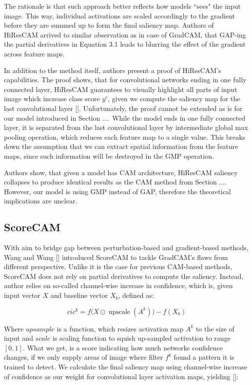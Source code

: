 The rationale is that such approach better reflects how models ``sees" the input image. This way, individual activations are scaled accordingly to the gradient before they are summed up to form the final saliency map. Authors of HiResCAM arrived to similar observation as in case of GradCAM, that GAP-ing the partial derivatives in Equation 3.1 leads to blurring the effect of the gradient across feature maps. 

In addition to the method itself, authors present a proof of HiResCAM's capabilities. The proof shows, that for convolutional networks ending in one fully connected layer, HiResCAM guarantees to visually highlight all parts of input image which increase class score $y^c$, given we compute the saliency map for the last convolutional layer []. Unfortunately, the proof cannot be extended as is for our model introduced in Section .... While the model ends in one fully connected layer, it is separated from the last convolutional layer by intermediate global max pooling operation, which reduces each feature map to a single value. This breaks down the assumption that we can extract spatial information from the feature maps, since such information will be destroyed in the GMP operation. 

Authors show, that given a model has CAM architecture, HiResCAM saliency collapses to produce identical results as the CAM method from Section .... However, our model is using GMP instead of GAP, therefore the theoretical implications are unclear.


\subsection{ScoreCAM}

With aim to bridge gap between perturbation-based and gradient-based methods, Wang and Wang [] introduced ScoreCAM to tackle GradCAM's flaws from different perspective. Unlike it is the case for previous CAM-based methods, ScoreCAM does not rely on partial derivatives to compute the saliency. Instead, author relies on so-called channel-wise increase in confidence, which is, given input vector $X$ and baseline vector $X_b$, defined as:

\begin{equation}
    cic^k = f\bigl(X \odot \operatorname{upscale}(A^k)\bigr) - f(X_b)
\end{equation}

Where $upsample$ is a function, which resizes activation map $A^k$ to the size of input and $scale$ is scaling function to squish up-sampled activation to range $[0, 1]$. What we get, is a score indicating how much networks confidence changes, if we only supply areas of image where filter $f^k$ found a pattern it is trained to detect. We calculate the final saliency map using channel-wise increase of confidence as our weight for convolutional layer activation maps, yielding []:

